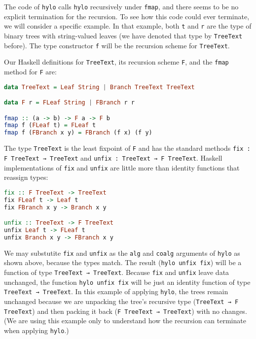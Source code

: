 The code of \lstinline!hylo! calls \lstinline!hylo! recursively under \lstinline!fmap!, and there seems to be no explicit termination for the recursion.
To see how this code could ever terminate, we will consider a specific example.
In that example, both \lstinline!t! and \lstinline!r! are the type of binary trees with string-valued leaves (we have denoted that type by \lstinline!TreeText! before).
The type constructor \lstinline!f! will be the recursion scheme for \lstinline!TreeText!.


Our Haskell definitions for \lstinline!TreeText!, its recursion scheme \lstinline!F!, and the \lstinline!fmap! method for \lstinline!F! are:


\begin{lstlisting}[language=Haskell]
data TreeText = Leaf String | Branch TreeText TreeText

data F r = FLeaf String | FBranch r r

fmap :: (a -> b) -> F a -> F b
fmap f (FLeaf t) = FLeaf t
fmap f (FBranch x y) = FBranch (f x) (f y)
\end{lstlisting}


The type \lstinline!TreeText! is the least fixpoint of \lstinline!F! and has the standard methods \lstinline!fix : F TreeText → TreeText! and \lstinline!unfix : TreeText → F TreeText!.
Haskell implementations of \lstinline!fix! and \lstinline!unfix! are little more than identity functions that reassign types:


\begin{lstlisting}[language=Haskell]
fix :: F TreeText -> TreeText
fix FLeaf t -> Leaf t
fix FBranch x y -> Branch x y

unfix :: TreeText -> F TreeText
unfix Leaf t -> FLeaf t
unfix Branch x y -> FBranch x y
\end{lstlisting}


We may substutite \lstinline!fix! and \lstinline!unfix! as the \lstinline!alg! and \lstinline!coalg! arguments of \lstinline!hylo! as shown above, because the types match.
The result (\lstinline!hylo unfix fix!) will be a function of type \lstinline!TreeText → TreeText!.
Because \lstinline!fix! and \lstinline!unfix! leave data unchanged, the function \lstinline!hylo unfix fix! will be just an identity function of type \lstinline!TreeText → TreeText!.
In this example of applying \lstinline!hylo!, the trees remain unchanged because we are unpacking the tree's recursive type (\lstinline!TreeText → F TreeText!) and then packing it back (\lstinline!F TreeText → TreeText!) with no changes.
(We are using this example only to understand how the recursion can terminate when applying \lstinline!hylo!.)


